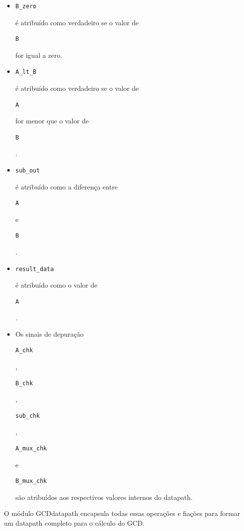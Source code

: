 \documentclass[a4paper,11pt]{article} %
\begin{document}
\begin{itemize}
    \item \begin{verbatim}B_zero\end{verbatim} é atribuído como verdadeiro se o valor de \begin{verbatim}B\end{verbatim} for igual a zero.
    \item \begin{verbatim}A_lt_B\end{verbatim} é atribuído como verdadeiro se o valor de \begin{verbatim}A\end{verbatim} for menor que o valor de \begin{verbatim}B\end{verbatim}.
    \item \begin{verbatim}sub_out\end{verbatim} é atribuído como a diferença entre \begin{verbatim}A\end{verbatim} e \begin{verbatim}B\end{verbatim}.
    \item \begin{verbatim}result_data\end{verbatim} é atribuído como o valor de \begin{verbatim}A\end{verbatim}.
    \item Os sinais de depuração \begin{verbatim}A_chk\end{verbatim}, \begin{verbatim}B_chk\end{verbatim}, \begin{verbatim}sub_chk\end{verbatim}, \begin{verbatim}A_mux_chk\end{verbatim} e \begin{verbatim}B_mux_chk\end{verbatim} são atribuídos aos respectivos valores internos do datapath.
\end{itemize}

O módulo GCDdatapath encapsula todas essas operações e fiações para formar um datapath completo para o cálculo do GCD.
\end{document}
